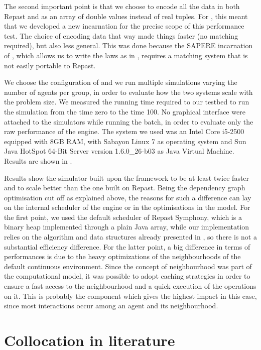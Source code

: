\documentclass[12pt,a4paper,twoside,openright]{book}
\begin{document}
The second important point is that we choose to encode all the data in both Repast and \alchemist{} as an array of double values instead of real tuples.
%
For \alchemist{}, this meant that we developed a new incarnation for the precise scope of this performance test.
%
The choice of encoding data that way made things faster (no matching required), but also less general.
%
This was done because the SAPERE incarnation of \alchemist{}, which allows us to write the laws as in , requires a matching system that is not easily portable to Repast.

We choose the configuration of  and we run multiple simulations varying the number of agents per group, in order to evaluate how the two systems scale with the problem size.
%
We measured the running time required to our testbed to run the simulation from the time zero to the time 100.
%
No graphical interface were attached to the simulators while running the batch, in order to evaluate only the raw performance of the engine.
%
The system we used was an Intel Core i5-2500 equipped with 8GB RAM, with Sabayon Linux 7 as operating system and Sun Java HotSpot\texttrademark{} 64-Bit Server version 1.6.0\_26-b03 as Java Virtual Machine.
%
Results are shown in .

Results show the simulator built upon the \alchemist{} framework to be at least twice faster and to scale better than the one built on Repast.
%
Being the dependency graph optimisation cut off as explained above, the reasons for such a difference can lay on the internal scheduler of the engine or in the optimisations in the model.
%
For the first point, we used the default scheduler of Repast Symphony, which is a binary heap implemented through a plain Java array, while our implementation relies on the algorithm and data structures already presented in , so there is not a substantial efficiency difference.
%
For the latter point, a big difference in terms of performances is due to the heavy optimizations of the neighbourhoods of the default \alchemist{} continuous environment.
%
Since the concept of neighbourhood was part of the computational model, it was possible to adopt caching strategies in order to ensure a fast access to the neighbourhood and a quick execution of the operations on it.
%
This is probably the component which gives the highest impact in this case, since most interactions occur among an agent and its neighbourhood.

\chapter{Collocation in literature}
\end{document}
